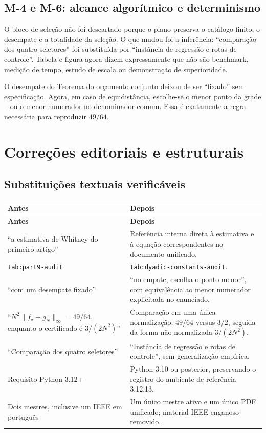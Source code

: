 \documentclass[11pt,a4paper]{article}
\begin{document}
\subsection{M-4 e M-6: alcance algorítmico e determinismo}

O bloco de seleção não foi descartado porque o plano preserva o catálogo finito, o
desempate e a totalidade da seleção. O que mudou foi a inferência: ``comparação dos quatro
seletores'' foi substituída por ``instância de regressão e rotas de controle''. Tabela e
figura agora dizem expressamente que não são benchmark, medição de tempo, estudo de escala
ou demonstração de superioridade.

O desempate do Teorema do orçamento conjunto deixou de ser ``fixado'' sem especificação.
Agora, em caso de equidistância, escolhe-se o menor ponto da grade -- ou o menor numerador
no denominador comum. Essa é exatamente a regra necessária para reproduzir $49/64$.

\section{Correções editoriais e estruturais}

\subsection{Substituições textuais verificáveis}

\begin{longtable}{L{0.39\textwidth}L{0.49\textwidth}}
\toprule
\textbf{Antes} & \textbf{Depois}\\
\midrule
\endfirsthead
\toprule
\textbf{Antes} & \textbf{Depois}\\
\midrule
\endhead
``a estimativa de Whitney do primeiro artigo'' & Referência interna direta à estimativa e
à equação correspondentes no documento unificado.\\
\texttt{tab:part9-audit} & \texttt{tab:dyadic-constants-audit}.\\
``com um desempate fixado'' & ``no empate, escolha o ponto menor'', com equivalência ao
menor numerador explicitada no enunciado.\\
``$N^2\|f_\star-g_N\|_\infty=49/64$, enquanto o certificado é $3/(2N^2)$'' &
Comparação em uma única normalização: $49/64$ versus $3/2$, seguida da forma não
normalizada $3/(2N^2)$.\\
``Comparação dos quatro seletores'' & ``Instância de regressão e rotas de controle'', sem
generalização empírica.\\
Requisito Python 3.12+ & Python 3.10 ou posterior, preservando o registro do ambiente de
referência 3.12.13.\\
Dois mestres, inclusive um IEEE em português & Um único mestre ativo e um único PDF
unificado; material IEEE enganoso removido.\\
\bottomrule
\end{longtable}
\end{document}
